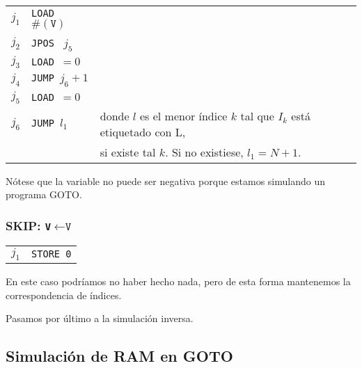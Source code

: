 \documentclass[twoside]{article}
\begin{document}
\begin{tabular}{l l l}
$j_1$ & \texttt{LOAD }$\#(\texttt{V})$ &\\
$j_2$ & \texttt{JPOS } $j_{5}$ &\\
$j_3$ & \texttt{LOAD }$=0$ &\\
$j_4$ & \texttt{JUMP }$j_{6}+1$& \\
$j_5$ & \texttt{LOAD }$=0$\\
$j_6$ & \texttt{JUMP }$l_1$ & donde $l$ es el menor índice $k$ tal que $I_k$ está etiquetado con L,\\
 &                       &      si existe tal $k$. Si no existiese, $l_1=N+1$. 
\end{tabular}

\vspace{0.5cm}

Nótese que la variable no puede ser negativa porque estamos simulando un programa GOTO.


\subsubsection{SKIP: \texttt{V}$\leftarrow\texttt{V}$}

\begin{tabular}{l l}
$j_1$ &  \texttt{STORE 0}
\end{tabular}

\vspace{0.5cm}

En este caso podríamos no haber hecho nada, pero de esta forma mantenemos la correspondencia de índices.


Pasamos por último a la simulación inversa.

\subsection{Simulación de RAM en GOTO}
\end{document}
